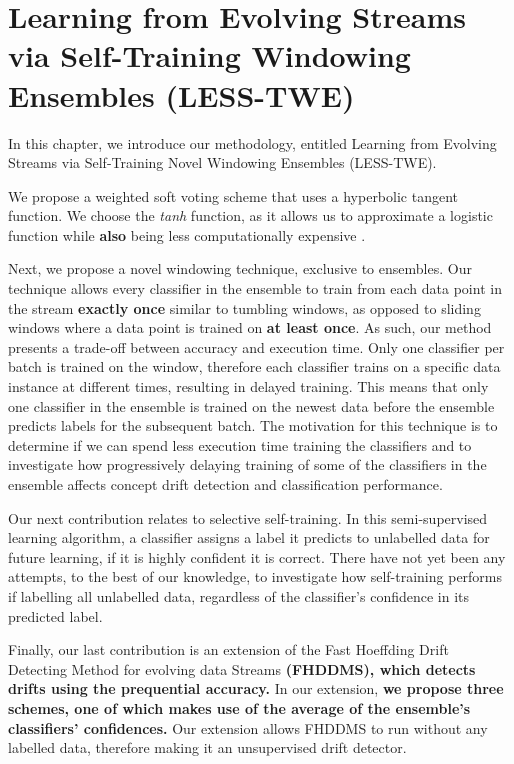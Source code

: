 \chapter{Learning from Evolving Streams via Self-Training Windowing Ensembles (LESS-TWE)\label{chapter:contributions}}%

In this chapter, we introduce our methodology, entitled Learning from Evolving Streams via Self-Training Novel Windowing Ensembles (LESS-TWE).

We propose a weighted soft voting scheme that uses a hyperbolic tangent function. We choose the \textit{tanh} function, as it allows us to approximate a logistic function while \textbf{also} being less computationally expensive \citep[10]{lecun2012efficient}.

Next, we propose a novel windowing technique, exclusive to ensembles. Our technique allows every classifier in the ensemble to train from each data point in the stream \textbf{exactly once} similar to tumbling windows, as opposed to sliding windows where a data point is trained on \textbf{at least once}. As such, our method presents a trade-off between accuracy and execution time. Only one classifier per batch is trained on the window, therefore each classifier trains on a specific data instance at different times, resulting in delayed training. This means that only one classifier in the ensemble is trained on the newest data before the ensemble predicts labels for the subsequent batch.
The motivation for this technique is to determine if we can spend less execution time training the classifiers and to investigate how progressively delaying training of some of the classifiers in the ensemble affects concept drift detection and classification performance.

Our next contribution relates to selective self-training. In this semi-supervised learning algorithm, a classifier assigns a label it predicts to unlabelled data for future learning, if it is highly confident it is correct. There have not yet been any attempts, to the best of our knowledge, to investigate how self-training performs if labelling all unlabelled data, regardless of the classifier's confidence in its predicted label.

Finally, our last contribution is an extension of the Fast Hoeffding Drift Detecting Method for evolving data Streams \textbf{(FHDDMS), which detects drifts using the prequential accuracy.} In our extension, \textbf{we propose three schemes, one of which makes use of the average of the ensemble's classifiers' confidences.} Our extension allows FHDDMS to run without any labelled data, therefore making it an unsupervised drift detector.


